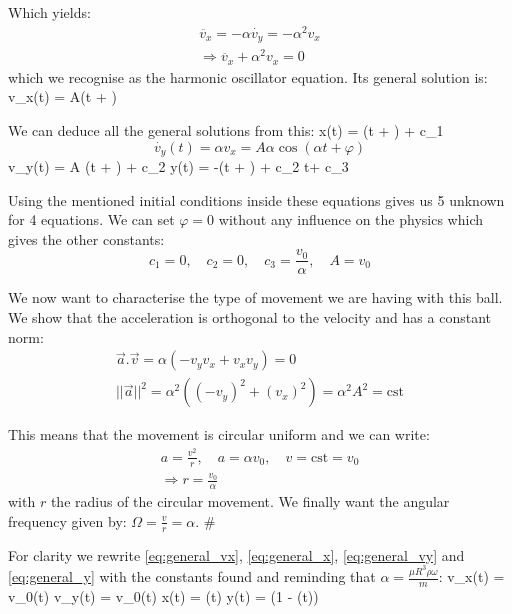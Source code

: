 Which yields:
\begin{align*}
    \ddot{v_x} = -\alpha \dot{v_y} = -\alpha ^2 v_x \\
    \Rightarrow \ddot{v_x} + \alpha^2 v_x = 0
\end{align*}
which we recognise as the harmonic oscillator equation. Its general solution is:
\be
    v_x(t) = A\cos(\alpha t + \varphi)
    \label{eq:general_vx}
\ee

We can deduce all the general solutions from this:
\be
    x(t) = \sin(\alpha t + \varphi) + c_1
    \label{eq:general_x}
\ee
\[ \dot{v_y}(t) = \alpha v_x = A\alpha\cos(\alpha t + \varphi) \]
\be
    \Rightarrow v_y(t) = A \sin(\alpha t + \varphi) + c_2
    \label{eq:general_vy}
\ee
\be
    \Rightarrow y(t) = -\cos(\alpha t + \varphi) + c_2 t+ c_3
    \label{eq:general_y}
\ee

Using the mentioned initial conditions inside these equations gives us 5 unknown for 4 equations. We can set $\varphi = 0$ without any influence on the physics which gives the other constants:
\[ c_1 = 0, \quad c_2 = 0, \quad c_3 = \frac{v_0}{\alpha}, \quad A = v_0\]

We now want to characterise the type of movement we are having with this ball. We show that the acceleration is orthogonal to the velocity and has a constant norm:
\begin{align*}
    \vec{a}.\vec{v} = \alpha(-v_y v_x + v_x v_y) = 0 \\
    ||\vec{a}||^2 = \alpha^2 ((-v_y)^2 + (v_x)^2) = \alpha^2 A^2 = \mathrm{cst}
\end{align*}

This means that the movement is circular uniform and we can write:
\begin{align*} 
    a = \frac{v^2}{r} , \quad a = \alpha v_0, \quad v = \mathrm{cst} = v_0 \\
    \Rightarrow r = \frac{v_0}{\alpha}
\end{align*}
with $r$ the radius of the circular movement. We finally want the angular frequency given by: $\Omega = \frac{v}{r} = \alpha$. \#

For clarity we rewrite \autoref{eq:general_vx}, \autoref{eq:general_x}, \autoref{eq:general_vy} and \autoref{eq:general_y} with the constants found and reminding that $\alpha = \frac{\mu R^3 \rho \omega}{m}$:
\be
    v_x(t) = v_0\cos(\alpha t)
    \label{eq:vx_g0}
\ee
\be
    v_y(t) = v_0\sin(\alpha t)
    \label{eq:vy_g0}
\ee
\be
    x(t) = \sin(\alpha t)
    \label{eq:x_g0}
\ee
\be
    y(t) = (1 - \cos(\alpha t))
    \label{eq:y_g0}
\ee


